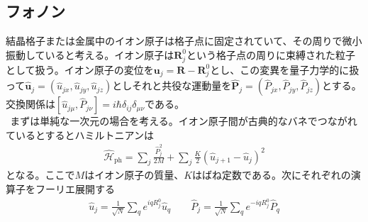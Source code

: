 \documentclass[dvipdfmx, 11pt, a4paper]{jsarticle}
\theoremstyle{definition}
\numberwithin{equation}{section}
\begin{document}
\subsection{フォノン}
    結晶格子または金属中のイオン原子は格子点に固定されていて、その周りで微小振動していると考える。イオン原子は$\bm{R}^0_j$という格子点の周りに束縛された粒子として扱う。イオン原子の変位を$\bm{u}_j = \bm{R}-\bm{R}^0_j$とし、この変異を量子力学的に扱って$\hat{\bm{u}}_j = (\hat{u}_{jx},\hat{u}_{jy},\hat{u}_{jz})$としそれと共役な運動量を$\hat{\bm{P}}_j = (\hat{P}_{jx},\hat{P}_{jy},\hat{P}_{jz})$とする。交換関係は$[\hat{u}_{j\mu},\hat{P}_{j\nu}]=i\hbar\delta_{ij}\delta_{\mu\nu}$である。\\
    $\ \ $まずは単純な一次元の場合を考える。イオン原子間が古典的なバネでつながれているとするとハミルトニアンは
    \begin{align}
        \hat{\mathscr{H}}_{\text{ph}} = \sum_j \frac{\hat{P}_j^2}{2M} + \sum_j \frac{K}{2}(\hat{u}_{j+1}-\hat{u}_j)^2
    \end{align}
    となる。ここで$M$はイオン原子の質量、$K$はばね定数である。次にそれぞれの演算子をフーリエ展開する
    \begin{align}
        \hat{u}_j= \frac{1}{\sqrt{N}}\sum_{q} e^{iqR_j^0}\hat{u}_q \qquad \hat{P}_j = \frac{1}{\sqrt{N}}\sum_q e^{-iqR_j^0 }\hat{P}_q
    \end{align}
\end{document}
